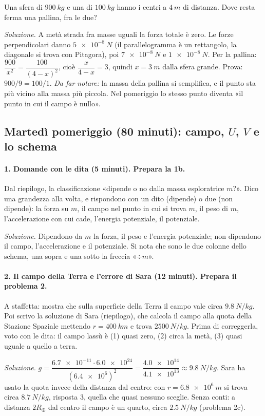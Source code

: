 \documentclass[11pt]{report}
\begin{document}
Una sfera di $\SI{900}{kg}$ e una di $\SI{100}{kg}$ hanno i centri a
$\SI{4}{m}$ di distanza. Dove resta ferma una pallina, fra le due?

\emph{Soluzione.} A metà strada fra masse uguali la forza totale è zero.
Le forze perpendicolari danno $\SI{5e-8}{N}$ (il parallelogramma è un
rettangolo, la diagonale si trova con Pitagora), poi $\SI{7e-8}{N}$ e
$\SI{1e-8}{N}$. Per la pallina: $\dfrac{900}{x^2} = \dfrac{100}{(4-x)^2}$,
cioè $\dfrac{x}{4-x} = 3$, quindi $x = \SI{3}{m}$ dalla sfera grande.
Prova: $900/9 = 100/1$. \emph{Da far notare:} la massa della pallina si
semplifica, e il punto sta più vicino alla massa più piccola. Nel
pomeriggio lo stesso punto diventa «il punto in cui il campo è nullo».

\subsection*{Martedì pomeriggio (80 minuti): campo, $U$, $V$ e lo schema}

\paragraph{1. Domande con le dita (5 minuti). Prepara la 1b.}
Dal riepilogo, la classificazione «dipende o no dalla massa esploratrice
$m$?». Dico una grandezza alla volta, e rispondono con un dito (dipende) o
due (non dipende): la forza su $m$, il campo nel punto in cui si trova $m$,
il peso di $m$, l'accelerazione con cui cade, l'energia potenziale, il
potenziale.

\emph{Soluzione.} Dipendono da $m$ la forza, il peso e l'energia
potenziale; non dipendono il campo, l'accelerazione e il potenziale. Si
nota che sono le due colonne dello schema, una sopra e una sotto la
freccia «$\div m$».

\paragraph{2. Il campo della Terra e l'errore di Sara (12 minuti). Prepara il problema 2.}
A staffetta: mostra che sulla superficie della Terra il campo vale circa
$\SI{9.8}{N/kg}$. Poi scrivo la soluzione di Sara (riepilogo), che calcola
il campo alla quota della Stazione Spaziale mettendo $r = \SI{400}{km}$ e
trova $\SI{2500}{N/kg}$. Prima di correggerla, voto con le dita: il campo
lassù è (1) quasi zero, (2) circa la metà, (3) quasi uguale a quello a
terra.

\emph{Soluzione.} $g = \dfrac{\num{6.7e-11} \cdot \num{6.0e24}}
{(\num{6.4e6})^2} = \dfrac{\num{4.0e14}}{\num{4.1e13}} \approx
\SI{9.8}{N/kg}$. Sara ha usato la quota invece della distanza dal centro:
con $r = \SI{6.8e6}{m}$ si trova circa $\SI{8.7}{N/kg}$, risposta 3, quella
che quasi nessuno sceglie. Senza conti: a distanza $2R_\oplus$ dal centro
il campo è un quarto, circa $\SI{2.5}{N/kg}$ (problema 2c).
\end{document}

